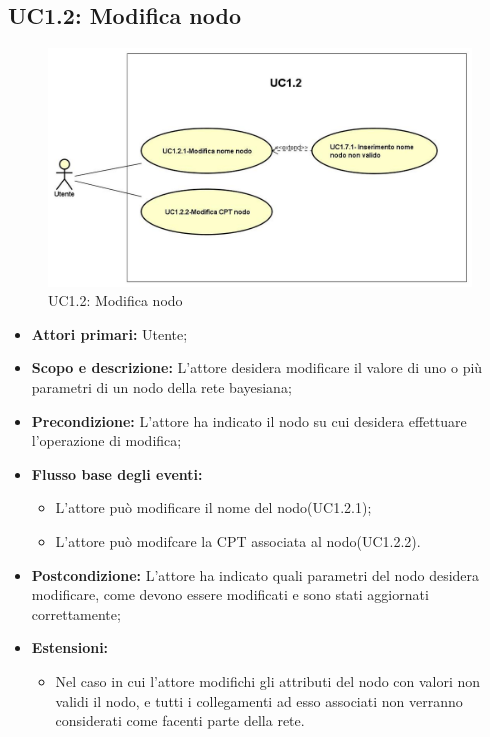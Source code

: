 \subsection{UC1.2: Modifica nodo} 
\begin{figure} [H]
	\centering
	\includegraphics[scale=0.45]{Img/UC1-2} 
	\caption{UC1.2: Modifica nodo} \label{} 
\end{figure} 
\begin{itemize} 
	\item{\textbf{Attori primari:} Utente;} 
	\item{\textbf{Scopo e descrizione:} L'attore desidera modificare il valore di uno o più parametri di un nodo della rete bayesiana;} 
	\item{\textbf{Precondizione:} L'attore ha indicato il nodo su cui desidera effettuare l'operazione di modifica;} 
	\item{\textbf{Flusso base degli eventi:} } 
		\begin{itemize} 
			\item{L'attore può modificare il nome del nodo(UC1.2.1);} 
			\item{L'attore può modifcare la CPT associata al nodo(UC1.2.2).} 		
		\end{itemize} 
	\item{\textbf{Postcondizione:} L'attore ha indicato quali parametri del nodo desidera modificare, come devono essere modificati e sono stati aggiornati correttamente;} 
	\item{\textbf{Estensioni:} } 
		\begin{itemize} 
			\item{Nel caso in cui l'attore modifichi gli attributi del nodo con valori non validi il nodo, e tutti i collegamenti ad esso associati non verranno considerati come facenti parte della rete.} 
		\end{itemize} 
\end{itemize} 
